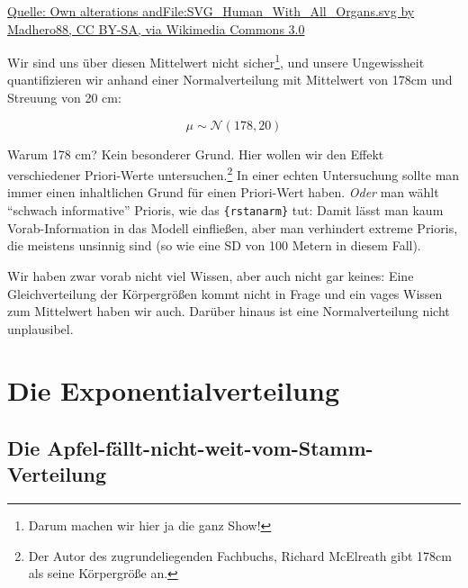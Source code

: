 \documentclass[
  a4paper,
  DIV=11]{scrreprt}
\theoremstyle{definition}
\theoremstyle{remark}
\begin{document}
\href{https://creativecommons.org/licenses/by-sa/3.0}{Quelle: Own
alterations andFile:SVG\_Human\_With\_All\_Organs.svg by Madhero88, CC
BY-SA, via Wikimedia Commons 3.0}

Wir sind uns über diesen Mittelwert nicht sicher\footnote{Darum machen
  wir hier ja die ganz Show!}, und unsere Ungewissheit quantifizieren
wir anhand einer Normalverteilung mit Mittelwert von 178cm und Streuung
von 20 cm:

\[\mu \sim \mathcal{N}(178, 20)\]

Warum 178 cm? Kein besonderer Grund. Hier wollen wir den Effekt
verschiedener Priori-Werte untersuchen.\footnote{Der Autor des
  zugrundeliegenden Fachbuchs, Richard McElreath gibt 178cm als seine
  Körpergröße an.} In einer echten Untersuchung sollte man immer einen
inhaltlichen Grund für einen Priori-Wert haben. \emph{Oder} man wählt
``schwach informative'' Prioris, wie das \texttt{\{rstanarm\}} tut:
Damit lässt man kaum Vorab-Information in das Modell einfließen, aber
man verhindert extreme Prioris, die meistens unsinnig sind (so wie eine
SD von 100 Metern in diesem Fall).

\begin{tcolorbox}[enhanced jigsaw, title=\textcolor{quarto-callout-note-color}{\faInfo}\hspace{0.5em}{Hinweis}, bottomtitle=1mm, bottomrule=.15mm, titlerule=0mm, colbacktitle=quarto-callout-note-color!10!white, colframe=quarto-callout-note-color-frame, leftrule=.75mm, left=2mm, toprule=.15mm, colback=white, arc=.35mm, breakable, toptitle=1mm, opacityback=0, rightrule=.15mm, coltitle=black, opacitybacktitle=0.6]

Wir haben zwar vorab nicht viel Wissen, aber auch nicht gar keines: Eine
Gleichverteilung der Körpergrößen kommt nicht in Frage und ein vages
Wissen zum Mittelwert haben wir auch. Darüber hinaus ist eine
Normalverteilung nicht unplausibel.

\end{tcolorbox}

\hypertarget{die-exponentialverteilung}{%
\section{Die Exponentialverteilung}\label{die-exponentialverteilung}}

\hypertarget{die-apfel-fuxe4llt-nicht-weit-vom-stamm-verteilung}{%
\subsection{Die
Apfel-fällt-nicht-weit-vom-Stamm-Verteilung}\label{die-apfel-fuxe4llt-nicht-weit-vom-stamm-verteilung}}
\end{document}

